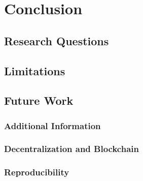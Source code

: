 
\chapter{Conclusion}\label{chapter:conclusion}
\section{Research Questions}
\section{Limitations}
\section{Future Work}
\subsection{Additional Information}
\subsection{Decentralization and Blockchain}
\subsection{Reproducibility}

